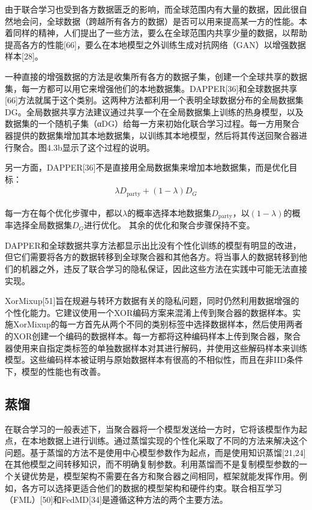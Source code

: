 由于联合学习也受到各方数据匮乏的影响，而全球范围内有大量的数据，因此很自然地会问，全球数据（跨越所有各方的数据）是否可以用来提高某一方的性能。本着同样的精神，人们提出了一些方法，要么在全球范围内共享少量的数据，以帮助提高各方的性能[66]，要么在本地模型之外训练生成对抗网络（GAN）以增强数据样本[28]。

一种直接的增强数据的方法是收集所有各方的数据子集，创建一个全球共享的数据集，每一方都可以用它来增强他们的本地数据集。DAPPER[36]和全球数据共享[66]方法就属于这个类别。这两种方法都利用一个表明全球数据分布的全局数据集DG。全局数据共享方法建议通过共享一个在全局数据集上训练的热身模型，以及数据集的一个随机子集（αDG）给每一方来初始化联合学习过程。每一方用聚合器提供的数据集增加其本地数据集，以训练其本地模型，然后将其传送回聚合器进行聚合。图4.3b显示了这个过程的说明。

另一方面，DAPPER[36]不是直接用全局数据集来增加本地数据集，而是优化目标：
\begin{align}
	\lambda D_{\text{party}} + (1 - \lambda)D_{G} \label{eq:4-8}
\end{align}

每一方在每个优化步骤中，都以$\lambda$的概率选择本地数据集$D_{\text{party}}$，以$(1 - \lambda)$的概率选择全局数据集$D_{G}$进行优化。 其余的优化和聚合步骤保持不变。

DAPPER和全球数据共享方法都显示出比没有个性化训练的模型有明显的改进，但它们需要将各方的数据转移到全球聚合器和其他各方。将当事人的数据转移到他们的机器之外，违反了联合学习的隐私保证，因此这些方法在实践中可能无法直接实现。

XorMixup[51]旨在规避与转环方数据有关的隐私问题，同时仍然利用数据增强的个性化能力。它建议使用一个XOR编码方案来混淆上传到聚合器的数据样本。实施XorMixup的每一方首先从两个不同的类别标签中选择数据样本，然后使用两者的XOR创建一个编码的数据样本。每一方都将这种编码样本上传到聚合器，聚合器使用来自指定类标签的单独数据样本对其进行解码，并使用这些解码样本来训练模型。这些编码样本被证明与原始数据样本有很高的不相似性，而且在非IID条件下，模型的性能也有改善。

\subsection{蒸馏}
在联合学习的一般表述下，当聚合器将一个模型发送给一方时，它将该模型作为起点，在本地数据上进行训练。通过蒸馏实现的个性化采取了不同的方法来解决这个问题。基于蒸馏的方法不是使用中心模型参数作为起点，而是使用知识蒸馏[21,24]在其他模型之间转移知识，而不明确复制参数。利用蒸馏而不是复制模型参数的一个关键优势是，模型架构不需要在各方和聚合器之间相同，框架就能发挥作用。例如，各方可以选择更适合他们的数据的模型架构和硬件约束。联合相互学习（FML）[50]和FedMD[34]是遵循这种方法的两个主要方法。

